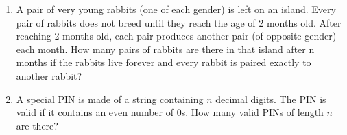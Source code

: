 \documentclass[11pt]{scrartcl}
\begin{document}
\begin{enumerate}
    \item A pair of very young rabbits (one of each gender) is left on an island. Every pair of rabbits does not breed until they reach the age of 2 months old. After reaching 2 months old, each pair produces another pair (of opposite gender) each month. How many pairs of rabbits are there in that island after n months if the rabbits live forever and every rabbit is paired exactly to another rabbit?

    \item A special PIN is made of a string containing $n$ decimal digits. The PIN is valid if it contains an even number of 0s. How many valid PINs of length $n$ are there?
\end{enumerate}
\end{document}
